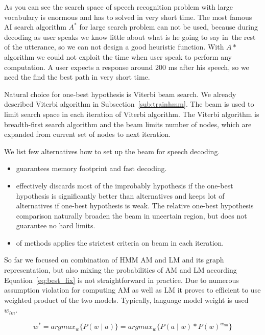 {As you can see the search space of speech recognition problem with 
large vocabulary is enormous and has to solved in very short time.
The most famous \ac{AI} search algorithm $A^*$ for large search problem can not be used,
because during decoding as user speaks we know little about what is he going to say in~the 
rest of the utterance, so we can not design a good heuristic function.
With $A*$ algorithm we could not exploit the time when user speak
to perform any computation. A user expects a response around 200 ms after his speech, 
so we need the find the best path in very short time.

Natural choice for one-best hypothesis is Viterbi beam search.\cite{huang2001spoken}
We already described Viterbi algorithm in Subsection~\ref{sub:trainhmm}.
The beam is used to limit search space in each iteration of Viterbi algorithm.
The Viterbi algorithm is breadth-first search algorithm and the beam limits 
number of nodes, which are expanded from current set of nodes to next iteration.


We list few alternatives how to set up the beam for speech decoding.
\begin{itemize}
    \item {} guarantees memory footprint and fast decoding.
    \item {} effectively discards 
        most of the improbably hypothesis if the one-best hypothesis is significantly better than alternatives
        and keeps lot of alternatives if one-best hypothesis is weak.
        The relative one-best hypothesis comparison naturally broaden the beam in uncertain region,
        but does not guarantee no hard limits.
    \item {} of methods applies the strictest criteria on beam in each iteration.
\end{itemize}


So far we focused on combination of \ac{HMM} \ac{AM} and \ac{LM} and its graph representation,
but also mixing the probabilities of \ac{AM} and \ac{LM} according Equation~\ref{eq:best_fix}
is not straightforward in practice. Due to numerous assumption violation for computing 
\ac{AM} as well as \ac{LM} it proves to efficient to use weighted product of the two models.
Typically, language model weight is used $w_{lm}$.

\begin{equation}\label{eq:am_lm}
    w^* = argmax_{w}\{P(w \mid a)\} = argmax_{w}\{P(a \mid w) * P(w)^{w_{lm}}\}
\end{equation}

}
